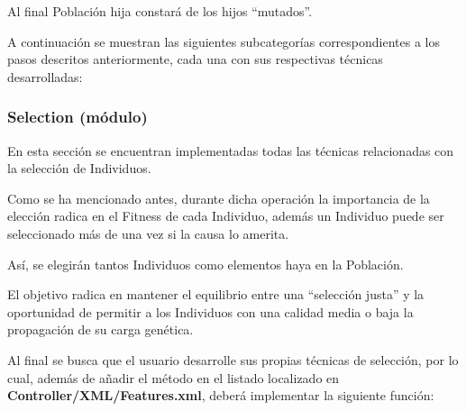 \documentclass[letterpaper,10pt,english]{sphinxmanual}
\begin{document}
Al final Población hija constará de los hijos ``mutados''.

A continuación se muestran las siguientes subcategorías correspondientes a los pasos descritos anteriormente, cada una con sus respectivas técnicas desarrolladas:


\subsubsection{Selection (módulo)}
\label{Model/Operator/Selection/Selection:selection-modulo}\label{Model/Operator/Selection/Selection::doc}
\begin{DUlineblock}{0em}
\item[] En esta sección se encuentran implementadas todas las técnicas relacionadas con
la selección de Individuos.
\item[] Como se ha mencionado antes, durante dicha operación la importancia de la elección
radica en el Fitness de cada Individuo, además un Individuo puede ser seleccionado más de una vez
si la causa lo amerita.
\item[] Así, se elegirán tantos Individuos como elementos haya en la Población.
\item[] El objetivo radica en mantener el equilibrio entre una ``selección justa'' y
la oportunidad de permitir a los Individuos con una calidad media o baja la propagación de su carga genética.
\item[] 
\item[] Al final se busca que el usuario desarrolle sus propias técnicas de selección, por lo cual, además
de añadir el método en el listado localizado en \textbf{Controller/XML/Features.xml}, deberá implementar la siguiente
función:
\end{DUlineblock}
\end{document}
